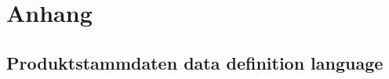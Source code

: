 \UseRawInputEncoding

\chapter{Anhang}\label{app:Anhang}

\section{Produktstammdaten data definition language}\label{app:ddl}




